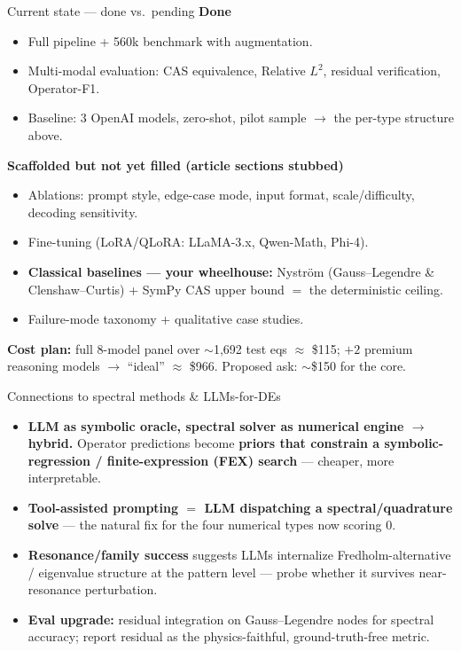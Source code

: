 \documentclass[10pt,aspectratio=169]{beamer}
\begin{document}
\begin{frame}{Current state --- done vs.\ pending}
  \textbf{Done}
  \begin{itemize}
    \item Full pipeline + 560k benchmark with augmentation.
    \item Multi-modal evaluation: CAS equivalence, Relative $L^2$, residual verification, Operator-F1.
    \item Baseline: 3 OpenAI models, zero-shot, pilot sample $\to$ the per-type structure above.
  \end{itemize}
  \textbf{Scaffolded but not yet filled (article sections stubbed)}
  \begin{itemize}
    \item Ablations: prompt style, edge-case mode, input format, scale/difficulty, decoding sensitivity.
    \item Fine-tuning (LoRA/QLoRA: LLaMA-3.x, Qwen-Math, Phi-4).
    \item \textbf{Classical baselines --- your wheelhouse:} Nystr\"om (Gauss--Legendre \&
          Clenshaw--Curtis) + SymPy CAS upper bound $=$ the deterministic ceiling.
    \item Failure-mode taxonomy + qualitative case studies.
  \end{itemize}
  \textbf{Cost plan:} full 8-model panel over $\sim$1{,}692 test eqs $\approx$ \$115;
  $+2$ premium reasoning models $\to$ ``ideal'' $\approx$ \$966. Proposed ask: $\sim$\$150 for the core.
\end{frame}

\begin{frame}{Connections to spectral methods \& LLMs-for-DEs}
  \begin{itemize}
    \item \textbf{LLM as symbolic oracle, spectral solver as numerical engine $\to$ hybrid.}
          Operator predictions become \textbf{priors that constrain a symbolic-regression / finite-expression
          (FEX) search} --- cheaper, more interpretable.
    \item \textbf{Tool-assisted prompting $=$ LLM dispatching a spectral/quadrature solve} --- the
          natural fix for the four numerical types now scoring 0.
    \item \textbf{Resonance/family success} suggests LLMs internalize Fredholm-alternative /
          eigenvalue structure at the pattern level --- probe whether it survives near-resonance perturbation.
    \item \textbf{Eval upgrade:} residual integration on Gauss--Legendre nodes for spectral accuracy;
          report residual as the physics-faithful, ground-truth-free metric.
  \end{itemize}
\end{frame}
\end{document}
